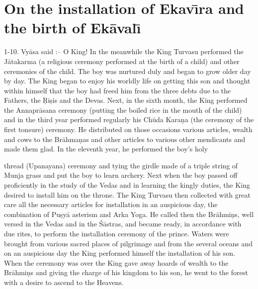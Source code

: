 \chapter{On the installation of Ekav\={\i}ra and the birth of Ek\=aval\={\i}}

1-10. Vy\=asa said :-- O King! In the meanwhile the King Turvasu performed the J\=atakarma (a religious ceremony performed at the birth of a child) and other ceremonies of the child. The boy was nurtured duly and began to grow older day by day. The King began to enjoy his worldly life on getting this son and thought within himself that the boy had freed him from the three debts due to the Fathers, the \d{R}i\d{s}is and the Devas. Next, in the sixth month, the King performed the Annapr\=asana ceremony (putting the boiled rice in the mouth of the child) and in the third year performed regularly his Ch\=uda Kara\d{n}a (the ceremony of the first tonsure) ceremony. He distributed on those occasions various articles, wealth and cows to the Br\=ahma\d{n}as and other articles to various other mendicants and made them glad. In the eleventh year, he performed the boy's holy

thread (Upanayana) ceremony and tying the girdle made of a triple string of Munja grass and put the boy to learn archery. Next when the boy passed off proficiently in the study of the Vedas and in learning the kingly duties, the King desired to install him on the throne. The King Turvasu then collected with great care all the necessary articles for installation in an auspicious day, the combination of Pu\d{s}y\=a asterism and Arka Yoga. He called then the Br\=ahmi\d{n}s, well versed in the Vedas and in the \'S\=astras, and became ready, in accordance with due rites, to perform the installation ceremony of the prince. Waters were brought from various sacred places of pilgrimage and from the several oceans and on an auspicious day the King performed himself the installation of his son. When the ceremony was over the King gave away hoards of wealth to the Br\=ahmi\d{n}s and giving the charge of his kingdom to his son, he went to the forest with a desire to ascend to the Heavens.


